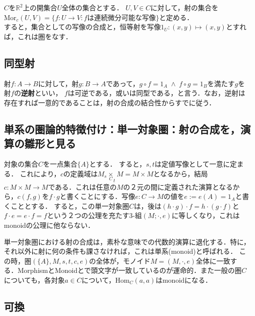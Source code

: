 \documentclass[uplatex, dvipdfmx]{jsreport}
\begin{document}
$C$を$\mathbb{R}^2$上の開集合$U$全体の集合とする．
$U,V\in C$に対して，射の集合を$\mathrm{Mor}_c(U,V)=\{f:U\rightarrow V: f\text{は連続微分可能な写像}\}$と定める．\\
すると，集合としての写像の合成と，恒等射を写像$1_U:(x,y)\longmapsto (x,y)$とすれば，これは圏をなす．

\subsection*{同型射}

\begin{definition}[可逆，同型，逆射]
    射$f:A\rightarrow B$に対して，射$g:B\rightarrow A$であって，$g\circ f=1_A \; \wedge \; f\circ g=1_B$を満たす$g$を射$f$の\textbf{逆射}といい，
    $f$は可逆である，或いは同型である，と言う．なお，逆射は存在すれば一意的であることは，射の合成の結合性からすでに従う．
\end{definition}

\subsection{単系の圏論的特徴付け：単一対象圏：射の合成を，演算の雛形と見る}

対象の集合$C$を一点集合$\{ A\}$とする．
すると，$s,t$は定値写像として一意に定まる．
これにより，$c$の定義域は$M_s\underset{C}{\times}_tM=M\times M$となるから，結局$c:M\times M\rightarrow M$である．これは任意の$M$の２元の間に定義された演算となるから，$c(f,g)$を$f\cdot g$と書くことにする．写像$e:C\rightarrow M$の値を$e:=e(A)=1_A$と書くこととする．
すると，この単一対象圏$C$は，後は$(h\cdot g)\cdot f = h\cdot (g\cdot f)$と$f\cdot e=e\cdot f = f$という２つの公理を充たす3-組$(M;\cdot,e)$に等しくなり，これはmonoidの公理に他ならない．

\begin{screen}
    単一対象圏における射の合成は，素朴な意味での代数的演算に退化する．特に，それ以外に射に何の条件も課さなければ，これは単系(monoid)と呼ばれる．
    この時，圏$(\{ A\}, M, s, t, c, e)$の全体が，モノイド$M=(M,\cdot,e)$全体に一致する．MorphismとMonoidとで頭文字が一致しているのが運命的．また一般の圏$C$についても，各対象$a\in C$について，$\mathrm{Hom}_C(a,a)$はmonoidになる．
\end{screen}

\subsection{可換}
\end{document}
